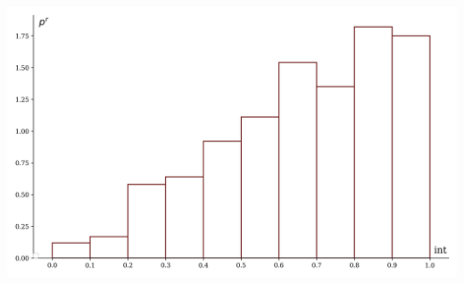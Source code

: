 \documentclass[a4paper, 14pt]{extarticle}
\begin{document}
\begin{minipage}[t]{0.25\textwidth}
  \includegraphics[width=\textwidth, height=\textheight, keepaspectratio]{sample8_hist}
\end{minipage}
\end{document}
